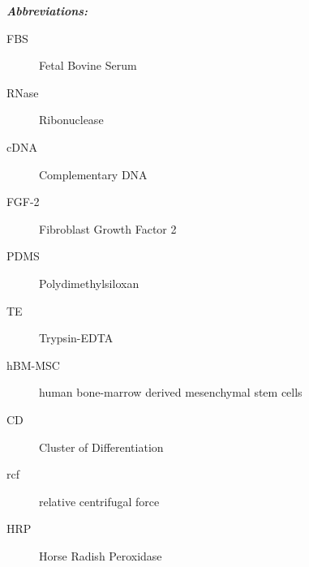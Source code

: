 \textit{\textbf{Abbreviations:}}
\begin{description}
\item[FBS] Fetal Bovine Serum
\item[RNase] Ribonuclease
\item[cDNA] Complementary DNA
\item[FGF-2] Fibroblast Growth Factor 2
\item[PDMS] Polydimethylsiloxan
\item[TE] Trypsin-EDTA
\item[hBM-MSC] human bone-marrow derived mesenchymal stem cells 
\item[CD] Cluster of Differentiation
\item[rcf] relative centrifugal force
\item[HRP] Horse Radish Peroxidase
\end{description}